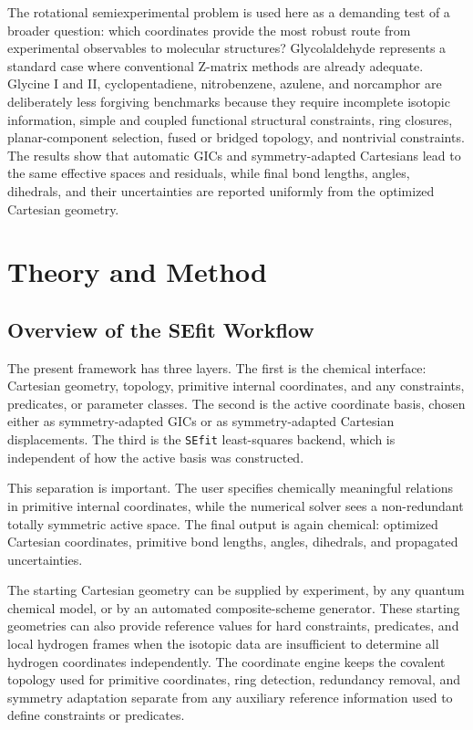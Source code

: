 \documentclass[journal=jctcce,manuscript=article,maxauthors=999]{achemso}
\begin{document}
The rotational semiexperimental problem is used here as a demanding test of a
broader question: which coordinates provide the most robust route from
experimental observables to molecular structures? Glycolaldehyde represents a
standard case where conventional Z-matrix methods are already adequate.
Glycine I and II, cyclopentadiene, nitrobenzene, azulene, and norcamphor are
deliberately less forgiving benchmarks because they require incomplete
isotopic information, simple and coupled functional structural constraints,
ring closures, planar-component selection, fused or bridged topology, and
nontrivial constraints. The results
show that automatic GICs and symmetry-adapted Cartesians lead to the same
effective spaces and residuals, while final bond lengths, angles, dihedrals,
and their uncertainties are reported uniformly from the optimized Cartesian
geometry.


\section{Theory and Method}

\subsection{Overview of the SEfit Workflow}

The present framework has three layers. The first is the chemical interface:
Cartesian geometry, topology, primitive internal coordinates, and any
constraints, predicates, or parameter classes. The second is the active
coordinate basis, chosen either as symmetry-adapted GICs or as
symmetry-adapted Cartesian displacements. The third is the \texttt{SEfit}
least-squares backend, which is independent of how the active basis was
constructed.

This separation is important. The user specifies chemically meaningful
relations in primitive internal coordinates, while the numerical solver sees a
non-redundant totally symmetric active space. The final output is again
chemical: optimized Cartesian coordinates, primitive bond lengths, angles,
dihedrals, and propagated uncertainties.

The starting Cartesian geometry can be supplied by experiment, by any quantum
chemical model, or by an automated composite-scheme generator. These starting
geometries can also provide reference values for hard constraints, predicates,
and local hydrogen frames when the isotopic data are insufficient to determine
all hydrogen coordinates independently. The coordinate engine keeps the
covalent topology used for primitive coordinates, ring detection, redundancy
removal, and symmetry adaptation separate from any auxiliary reference
information used to define constraints or predicates.
\end{document}
